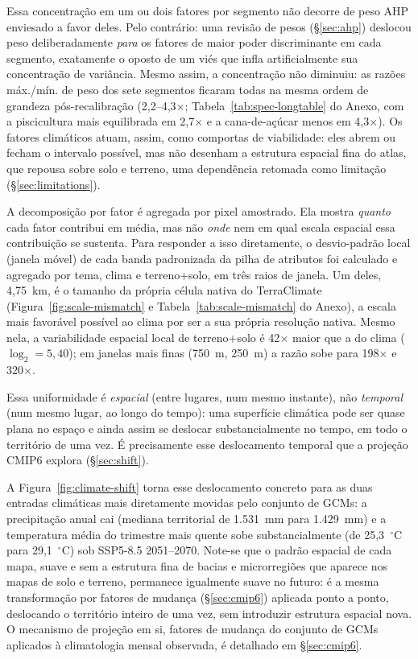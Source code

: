 Essa concentração em um ou dois fatores por segmento não decorre de peso AHP enviesado a favor
deles. Pelo contrário: uma revisão de pesos (\S\ref{sec:ahp}) deslocou peso
deliberadamente \emph{para} os fatores de maior poder discriminante em cada segmento, exatamente
o oposto de um viés que infla artificialmente sua concentração de variância. Mesmo assim, a
concentração não diminuiu: as razões máx./mín. de peso dos sete segmentos ficaram todas na mesma
ordem de grandeza pós-recalibração (2,2--4,3$\times$; Tabela~\ref{tab:spec-longtable} do Anexo,
com a piscicultura mais equilibrada em 2,7$\times$ e a cana-de-açúcar menos em 4,3$\times$). 
Os fatores climáticos atuam, assim, como
comportas de viabilidade: eles abrem ou fecham o intervalo possível, mas não desenham a
estrutura espacial fina do atlas, que repousa sobre solo e terreno, uma dependência retomada
como limitação (\S\ref{sec:limitations}).

A decomposição por fator é agregada por pixel amostrado. Ela mostra \emph{quanto} cada fator
contribui em média, mas não \emph{onde} nem em qual escala espacial essa contribuição se
sustenta. Para responder a isso diretamente, o desvio-padrão local (janela móvel) de cada banda
padronizada da pilha de atributos foi calculado e agregado por tema, clima e terreno+solo, em
três raios de janela. Um deles, 4,75~km, é o tamanho da própria célula nativa do TerraClimate
(Figura~\ref{fig:scale-mismatch} e Tabela~\ref{tab:scale-mismatch} do Anexo), a escala mais
favorável possível ao clima por ser a sua própria resolução nativa. Mesmo nela, a variabilidade
espacial local de terreno+solo é 42$\times$ maior que a do clima ($\log_2 = 5{,}40$); em janelas
mais finas (750~m, 250~m) a razão sobe para 198$\times$ e 320$\times$. 

Essa uniformidade é \emph{espacial} (entre lugares, num mesmo instante), não \emph{temporal}
(num mesmo lugar, ao longo do tempo): uma superfície climática pode ser quase plana no espaço e
ainda assim se deslocar substancialmente no tempo, em todo o território de uma vez. É
precisamente esse deslocamento temporal que a projeção CMIP6 explora (\S\ref{sec:shift}).

A Figura~\ref{fig:climate-shift} torna esse deslocamento concreto para as duas entradas
climáticas mais diretamente movidas pelo conjunto de GCMs: a precipitação anual cai (mediana
territorial de 1.531~mm para 1.429~mm) e a temperatura média do trimestre mais quente sobe
substancialmente (de 25,3~$^\circ$C para 29,1~$^\circ$C) sob SSP5-8.5 2051--2070. Note-se que o
padrão espacial de cada mapa, suave e sem a estrutura fina de bacias e microrregiões que
aparece nos mapas de solo e terreno, permanece igualmente suave no futuro: é a mesma
transformação por fatores de mudança (\S\ref{sec:cmip6}) aplicada ponto a ponto, deslocando o
território inteiro de uma vez, sem introduzir estrutura espacial nova. O mecanismo de projeção
em si, fatores de mudança do conjunto de GCMs aplicados à climatologia mensal observada, é
detalhado em \S\ref{sec:cmip6}.

